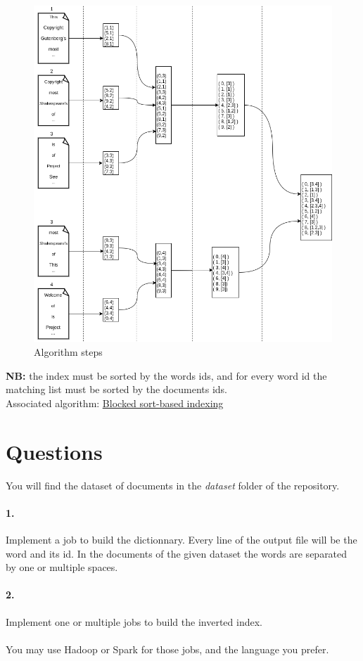 \documentclass[12pt,french,titlepage]{article}
\begin{document}
\begin{figure}[H]
    \centering
    \includegraphics[scale=0.6]{images/algorithm}
    \caption{Algorithm steps}
    \label{fig:algorithm_steps}
\end{figure}
\textbf{NB:} the index must be sorted by the words ids, and for every word id the matching list must be sorted by the documents ids.
\\
Associated algorithm: \href{https://nlp.stanford.edu/IR-book/html/htmledition/blocked-sort-based-indexing-1.html}{\underline{Blocked sort-based indexing}}

\section{Questions}
You will find the dataset of documents in the \textit{dataset} folder of the repository.
\paragraph{1.} Implement a job to build the dictionnary. Every line of the output file will be the word and its id. In the documents of the given dataset the words are separated by one or multiple spaces.
\paragraph{2.} Implement one or multiple jobs to build the inverted index.
\\\\
You may use Hadoop or Spark for those jobs, and the language you prefer.
\end{document}
